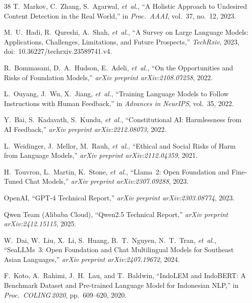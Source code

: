 \documentclass[conference]{IEEEtran}
\begin{document}
\begin{thebibliography}{38}
T.~Markov, C.~Zhang, S.~Agarwal, \textit{et~al.}, ``A Holistic Approach to
Undesired Content Detection in the Real World,'' in \textit{Proc.\ AAAI},
vol.~37, no.~12, 2023.

M.~U.~Hadi, R.~Qureshi, A.~Shah, \textit{et~al.}, ``A Survey on Large Language
Models: Applications, Challenges, Limitations, and Future Prospects,''
\textit{TechRxiv}, 2023, doi:~10.36227/techrxiv.23589741.v4.

R.~Bommasani, D.~A.~Hudson, E.~Adeli, \textit{et~al.}, ``On the Opportunities
and Risks of Foundation Models,'' \textit{arXiv preprint arXiv:2108.07258}, 2022.

L.~Ouyang, J.~Wu, X.~Jiang, \textit{et~al.}, ``Training Language Models to
Follow Instructions with Human Feedback,'' in \textit{Advances in NeurIPS},
vol.~35, 2022.

Y.~Bai, S.~Kadavath, S.~Kundu, \textit{et~al.}, ``Constitutional AI:
Harmlessness from AI Feedback,'' \textit{arXiv preprint arXiv:2212.08073}, 2022.

L.~Weidinger, J.~Mellor, M.~Rauh, \textit{et~al.}, ``Ethical and Social Risks
of Harm from Language Models,'' \textit{arXiv preprint arXiv:2112.04359}, 2021.

H.~Touvron, L.~Martin, K.~Stone, \textit{et~al.}, ``Llama~2: Open Foundation
and Fine-Tuned Chat Models,'' \textit{arXiv preprint arXiv:2307.09288}, 2023.

OpenAI, ``GPT-4 Technical Report,'' \textit{arXiv preprint arXiv:2303.08774},
2023.

Qwen Team (Alibaba Cloud), ``Qwen2.5 Technical Report,''
\textit{arXiv preprint arXiv:2412.15115}, 2025.

W.~Dai, W.~Liu, X.~Li, S.~Huang, B.~T.~Nguyen, N.~T.~Tran, \textit{et~al.},
``SeaLLMs~3: Open Foundation and Chat Multilingual Models for Southeast Asian
Languages,'' \textit{arXiv preprint arXiv:2407.19672}, 2024.

F.~Koto, A.~Rahimi, J.~H.~Lau, and T.~Baldwin, ``IndoLEM and IndoBERT:
A Benchmark Dataset and Pre-trained Language Model for Indonesian NLP,''
in \textit{Proc.\ COLING\,2020}, pp.~609--620, 2020.


\end{thebibliography}
\end{document}
